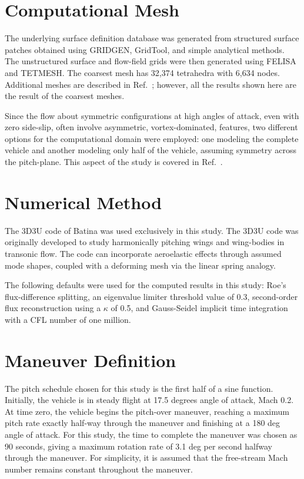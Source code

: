 \documentclass[cover]{aiaa}%
\begin{document}
\section{Computational Mesh}

The underlying surface definition database was generated from
structured surface patches obtained using
GRIDGEN\cite{GRIDGEN3D_release}, GridTool\cite{GridTool}, and
simple analytical methods.  The unstructured surface and
flow-field grids were then generated using
FELISA\cite{peraire:90cp} and TETMESH.\cite{kennon:92cp} The
coarsest mesh has 32,374 tetrahedra with 6,634 nodes.  Additional
meshes are described in Ref.~; however, all the
results shown here are the result of the coarsest meshes.

Since the flow about symmetric configurations at high angles of attack,
even with zero side-slip, often involve asymmetric, vortex-dominated,
features,\cite{yoshinaga:94cp,cobleigh:94cp,dusing:93cp,fisher:94cp}
two different options for the computational domain were employed:
one modeling the complete vehicle and another modeling only half
of the vehicle, assuming symmetry across the pitch-plane.  This
aspect of the study is covered in Ref.~.

\section{Numerical Method}

The 3D3U code of Batina\cite{batina:93aij} was used exclusively in this
study. The 3D3U code was originally developed to study harmonically
pitching wings and wing-bodies in transonic flow.  The code can
incorporate aeroelastic effects through assumed mode shapes, coupled
with a deforming mesh via the linear spring analogy.

The following defaults were used for the computed results in this
study: Roe's flux-difference splitting, an eigenvalue limiter
threshold value of 0.3, second-order flux reconstruction using a
$\kappa$ of 0.5, and Gauss-Seidel implicit time integration with
a CFL number of one million.

\section{Maneuver Definition}

The pitch schedule chosen for this study is the first half of a
sine function.  Initially, the vehicle is in steady flight at
17.5 degrees angle of attack, Mach 0.2.  At time zero, the
vehicle begins the pitch-over maneuver, reaching a maximum pitch
rate exactly half-way through the maneuver and finishing at a 180
deg angle of attack.  For this study, the time to complete the
maneuver was chosen as 90 seconds, giving a maximum rotation rate
of 3.1 deg per second halfway through the maneuver.  For
simplicity, it is assumed that the free-stream Mach number
remains constant throughout the maneuver.
\end{document}
